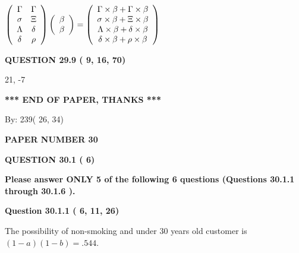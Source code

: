 \documentclass[12pt]{article}
\begin{document}
$  %
 \left( \begin{array}
 {
 c
 c
 }
 \Gamma & 
 \Gamma \\ 
 \sigma & 
                    \Xi \\ 
 \Lambda & 
 \delta \\ 
 \delta & 
 \rho
 \end{array} \right)
 \left( \begin{array}
 {
 c
 }
 \beta \\ 
 \beta
 \end{array} \right)
=
  \left( \begin{array}
 {
 c
 }
 \Gamma \times  \beta   +  \Gamma \times  \beta \\ 
 \sigma \times  \beta   +                     \Xi \times  \beta \\ 
 \Lambda \times  \beta   +  \delta \times  \beta \\ 
 \delta \times  \beta   +  \rho \times  \beta
 \end{array} \right)
$
 
  
  
{\textbf{\large{QUESTION
29.9 
 (          9,         16,         70)
}}}

21,  %
-7
 
   
   
   
   
\vspace{1.0in} 
{\textbf{\large{ *** END OF PAPER, THANKS *** }}} 
   
   
\hspace{1.0in} By: 
         239(         26,          34)
   
   
   
   
\newpage 
\setcounter{page}{ 
    30001 } 
   
   
 {\textbf{ \Large{ PAPER NUMBER          30 }}}
   
   
   
   
  
\vspace{0.2in}
  
{\textbf{\Large{QUESTION
30.1 
 (          6)
}}}
  
  
{\textbf{\Large{Please answer ONLY  %
           5 %
 of the following  %
           6 %
 questions (Questions  %
30.1.1 %
 through  %
30.1.6 %
 ). }}}
   
   
  
  
{\textbf{\large{Question
30.1.1 
 (          6,         11,         26)
}}}

The possibility of  %
 non-smoking and  %
under 30 years old
customer is $ (1-a)(1-b) =  %
.544 $.
  
\end{document}
